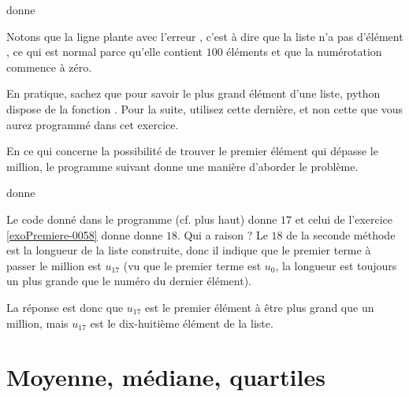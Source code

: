 


donne



Notons que la ligne  plante avec l'erreur , c'est à dire que la liste  n'a pas d'élément , ce qui est normal parce qu'elle contient \( 100\) éléments et que la numérotation commence à zéro.




    En pratique, sachez que pour savoir le plus grand élément d'une liste, python dispose de la fonction . Pour la suite, utilisez cette dernière, et non cette que vous aurez programmé dans cet exercice.



En ce qui concerne la possibilité de trouver le premier élément qui dépasse le million, le programme suivant donne une manière d'aborder le problème.



donne




\begin{remark}
    
    Le code donné dans le programme  (cf. plus haut) donne \( 17\) et celui de l'exercice \ref{exoPremiere-0058} donne donne \( 18\). Qui a raison ? Le \( 18\) de la seconde méthode est la longueur de la liste construite, donc il indique que le premier terme à passer le million est \( u_{17}\) (vu que le premier terme est \( u_0\), la longueur est toujours un plus grande que le numéro du dernier élément).

La réponse est donc que \( u_{17}\) est le premier élément à être plus grand que un million, mais \( u_{17}\) est le dix-huitième élément de la liste.

\end{remark}

\section{Moyenne, médiane, quartiles}
\label{SecZYftar}

